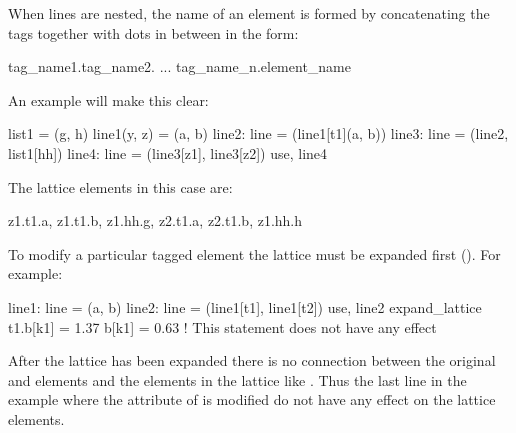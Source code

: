 When lines are nested, the name of an element is formed by concatenating the tags
together with dots in between in the form:
\begin{example}
  tag_name1.tag_name2. ... tag_name_n.element_name
\end{example}
An example will make this clear:
\begin{example}
  list1 = (g, h)
  line1(y, z) = (a, b)
  line2: line = (line1[t1](a, b))
  line3: line = (line2, list1[hh])
  line4: line = (line3[z1], line3[z2])
  use, line4
\end{example}
The lattice elements in this case are:
\begin{example}
  z1.t1.a, z1.t1.b, z1.hh.g, z2.t1.a, z2.t1.b, z1.hh.h 
\end{example}

To modify a particular tagged element the lattice must be expanded
first (). For example:
\begin{example}
  line1: line = (a, b)
  line2: line = (line1[t1], line1[t2])
  use, line2
  expand_lattice
  t1.b[k1] = 1.37
  b[k1] = 0.63       ! This statement does not have any effect
\end{example}
After the lattice has been expanded there is no connection between 
the original  and  elements and the elements in the lattice like
. Thus the last line in the example where the  attribute of 
is modified do not have any effect on the lattice elements. 
